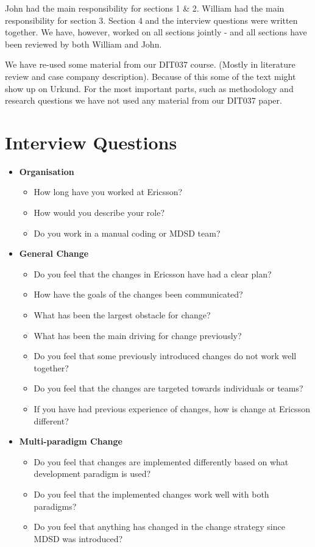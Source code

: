 \documentclass[10pt,twocolumn]{article}
\begin{document}




John had the main responsibility for sections 1 \& 2. William had the main responsibility for section 3. Section 4 and the interview questions were written together. We have, however, worked on all sections jointly - and all sections have been reviewed by both William and John. 

We have re-used some material from our DIT037 course. (Mostly in literature review and case company description). Because of this some of the text might show up on Urkund. For the most important parts, such as methodology and research questions we have not used any material from our DIT037 paper. 

\newpage
\appendix

\section{Interview Questions}
\begin{itemize}
\item \textbf{Organisation}
\begin{itemize}
\item How long have you worked at Ericsson?
\item How would you describe your role?
\item Do you work in a manual coding or MDSD team?
\end{itemize}

\item \textbf{General Change}
\begin{itemize}
\item Do you feel that the changes in Ericsson have had a clear plan?
\item How have the goals of the changes been communicated? 
\item What has been the largest obstacle for change?
\item What has been the main driving for change previously?
\item Do you feel that some previously introduced changes do not work well together?
\item Do you feel that the changes are targeted towards individuals or teams? 
\item If you have had previous experience of changes, how is change at Ericsson different? 
\end{itemize}

\item \textbf{Multi-paradigm Change}
\begin{itemize}
\item Do you feel that changes are implemented differently based on what development paradigm is used?
\item Do you feel that the implemented changes work well with both paradigms? 
\item Do you feel that anything has changed in the change strategy since MDSD was introduced? 
\end{itemize}


\end{itemize}
\end{document}
